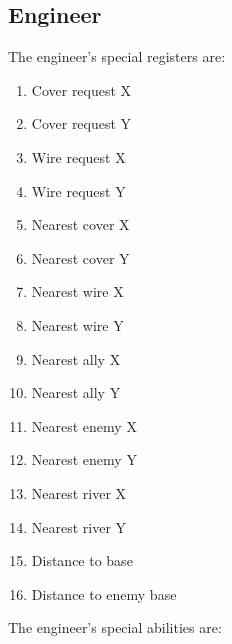 \documentclass{article}
\begin{document}
\subsection*{Engineer}

The engineer's special registers are:

\begin{enumerate}[noitemsep]
    \item Cover request X
    \item Cover request Y
    \item Wire request X
    \item Wire request Y
    \item Nearest cover X
    \item Nearest cover Y
    \item Nearest wire X
    \item Nearest wire Y
    \item Nearest ally X
    \item Nearest ally Y
    \item Nearest enemy X
    \item Nearest enemy Y
    \item Nearest river X
    \item Nearest river Y
    \item Distance to base
    \item Distance to enemy base
\end{enumerate}

The engineer's special abilities are:
\end{document}
